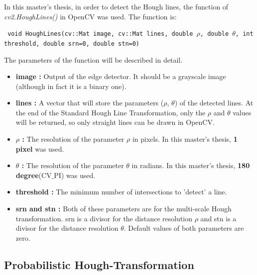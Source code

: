 In this master's thesis, in order to detect the Hough lines, the function of \textit{cv2.HoughLines()} in OpenCV was used. The function is:

  \begin{center}
  
\texttt{ void HoughLines(cv::Mat image, cv::Mat lines, double $\rho$, double $\theta$, int threshold, double srn=0, double stn=0)}

  \end{center}

The parameters of the function will be described in detail.\cite{Standard_Hough_Transformation2}
 
\begin{itemize}

\item \textbf{image : }Output of the edge detector. It should be a grayscale image (although in fact it is a binary one).
 
\item \textbf{lines : }A vector that will store the parameters ($ \rho $, $ \theta $) of the detected lines. At the end of the Standard Hough Line Transformation, only the $ \rho $ and $ \theta $ values will be returned, so only straight lines can be drawn in OpenCV.

\item \textbf{$ \rho $ : }The resolution of the parameter $ \rho $ in pixels. In this master's thesis, \textbf{1 pixel} was used.

\item \textbf{$ \theta $ : }The resolution of the parameter $ \theta $ in radians. In this master's thesis, \textbf{180 degree}(CV$ \_ $PI) was used.

\item \textbf{threshold : }The minimum number of intersections to 'detect' a line.

\item \textbf{srn and stn : }Both of these parameters are for the multi-scale Hough transformation. srn is a divisor for the distance resolution $ \rho $ and stn is a divisor for the distance resolution $ \theta $. Default values of both parameters are zero.

\end{itemize}

%
\subsection{Probabilistic Hough-Transformation}\label{sec:Probabilistic Hough-Transformation}
%

